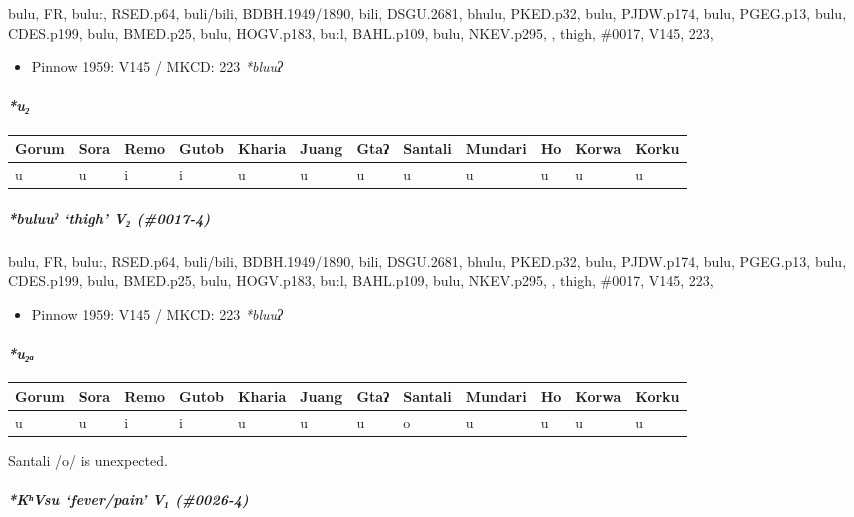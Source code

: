 \documentclass[a4paper,]{article}
\providecommand{\tightlist}{%
  \setlength{\itemsep}{0pt}\setlength{\parskip}{0pt}}
\let\oldparagraph\paragraph
\renewcommand{\paragraph}[1]{\oldparagraph{#1}\mbox{}}
\let\oldsubparagraph\subparagraph
\renewcommand{\subparagraph}[1]{\oldsubparagraph{#1}\mbox{}}
\begin{document}
bulu, FR, bulu:, RSED.p64, buli/bili, BDBH.1949/1890, bili, DSGU.2681,
bhulu, PKED.p32, bulu, PJDW.p174, bulu, PGEG.p13, bulu, CDES.p199, bulu,
BMED.p25, bulu, HOGV.p183, bu:l, BAHL.p109, bulu, NKEV.p295, , thigh,
\#0017, V145, 223,

\begin{itemize}
\tightlist
\item
  Pinnow 1959: V145 / MKCD: 223 \emph{*bluuʔ}
\end{itemize}

\paragraph{\texorpdfstring{\emph{*u₂}}{*u₂}}\label{u-1}

\begin{longtable}[]{@{}llllllllllll@{}}
\toprule
Gorum & Sora & Remo & Gutob & Kharia & Juang & Gtaʔ & Santali & Mundari
& Ho & Korwa & Korku\tabularnewline
\midrule
\endhead
u & u & i & i & u & u & u & u & u & u & u & u\tabularnewline
\bottomrule
\end{longtable}

\subparagraph{\texorpdfstring{\emph{*buluuˀ} `thigh' V₂
(\#0017-4)}{*buluuˀ thigh V₂ (\#0017-4)}}\label{buluuux2c0-thigh-v-0017-4}

bulu, FR, bulu:, RSED.p64, buli/bili, BDBH.1949/1890, bili, DSGU.2681,
bhulu, PKED.p32, bulu, PJDW.p174, bulu, PGEG.p13, bulu, CDES.p199, bulu,
BMED.p25, bulu, HOGV.p183, bu:l, BAHL.p109, bulu, NKEV.p295, , thigh,
\#0017, V145, 223,

\begin{itemize}
\tightlist
\item
  Pinnow 1959: V145 / MKCD: 223 \emph{*bluuʔ}
\end{itemize}

\paragraph{\texorpdfstring{\emph{*u₂ₐ}}{*u₂ₐ}}\label{uux2090-1}

\begin{longtable}[]{@{}llllllllllll@{}}
\toprule
Gorum & Sora & Remo & Gutob & Kharia & Juang & Gtaʔ & Santali & Mundari
& Ho & Korwa & Korku\tabularnewline
\midrule
\endhead
u & u & i & i & u & u & u & o & u & u & u & u\tabularnewline
\bottomrule
\end{longtable}

Santali /o/ is unexpected.

\subparagraph{\texorpdfstring{\emph{*KʰVsu} `fever/pain' V₁
(\#0026-4)}{*KʰVsu fever/pain V₁ (\#0026-4)}}\label{kux2b0vsu-feverpain-v-0026-4}
\end{document}

